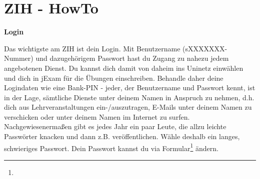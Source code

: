 \section{ZIH - HowTo}

\textbf{Login}

Das wichtigste am ZIH ist dein Login. Mit Benutzername (sXXXXXXX-Nummer) und dazugehörigem Passwort hast du Zugang zu nahezu jedem angebotenen Dienst. Du kannst dich damit von daheim ins Uninetz einwählen und dich in jExam für die Übungen einschreiben. Behandle daher deine Logindaten wie eine Bank-PIN - jeder, der Benutzername und Passwort kennt, ist in der Lage, sämtliche Dienste unter deinem Namen in Anspruch zu nehmen, d.h. dich aus Lehrveranstaltungen ein-/auszutragen, E-Mails unter deinem Namen zu verschicken oder unter deinem Namen im Internet zu surfen. Nachgewiesenermaßen gibt es jedes Jahr ein paar Leute, die allzu leichte Passwörter knacken und dann z.B. veröffentlichen. Wähle deshalb ein langes, schwieriges Passwort. Dein Passwort kannst du via Formular\footnote{} ändern.